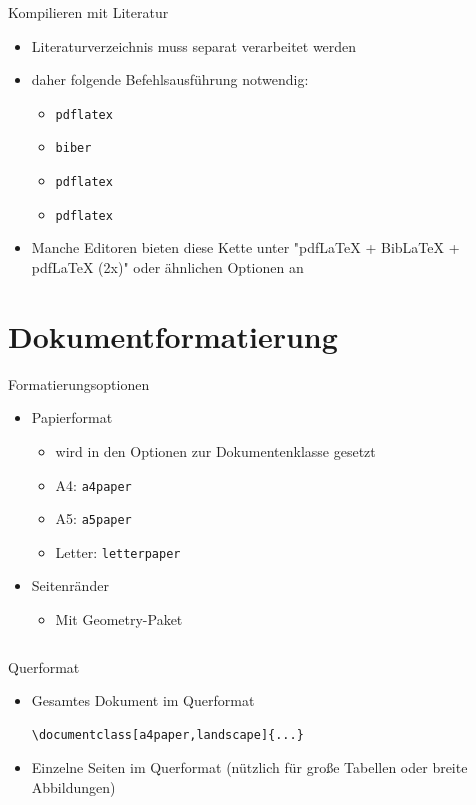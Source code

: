 \documentclass[presentation,aspectratio=169]{beamer}
\begin{document}
\begin{frame}[fragile]{Kompilieren mit Literatur}
  \begin{itemize}
    \item Literaturverzeichnis muss separat verarbeitet werden
    \item daher folgende Befehlsausführung notwendig:
      \begin{itemize}
        \item \verb|pdflatex|
        \item \verb|biber|
        \item \verb|pdflatex|
        \item \verb|pdflatex|
      \end{itemize}
    \item Manche Editoren bieten diese Kette unter "pdf\LaTeX{} + Bib\LaTeX{} + pdf\LaTeX{} (2x)" oder ähnlichen Optionen an
  \end{itemize}
\end{frame}

\section{Dokumentformatierung}

\begin{frame}[fragile]{Formatierungsoptionen}
  \begin{itemize}
    \item Papierformat
      \begin{itemize}
        \item wird in den Optionen zur Dokumentenklasse gesetzt
        \item A4: \verb|a4paper|
        \item A5: \verb|a5paper|
        \item Letter: \verb|letterpaper|
      \end{itemize}
    \item Seitenränder
      \begin{itemize}
        \item Mit Geometry-Paket
          \inputminted{latex}{codebeispiele/geometry.tex}
      \end{itemize}
  \end{itemize}
\end{frame}

\begin{frame}[fragile]{Querformat}
  \begin{itemize}
    \item Gesamtes Dokument im Querformat
      \begin{verbatim}
\documentclass[a4paper,landscape]{...}
      \end{verbatim}
    \item Einzelne Seiten im Querformat (nützlich für große Tabellen oder breite Abbildungen)
      \inputminted{latex}{codebeispiele/landscape.tex}
  \end{itemize}
\end{frame}
\end{document}
